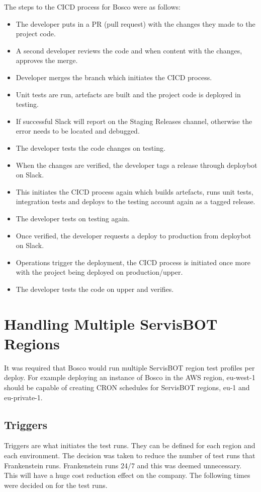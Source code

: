 \documentclass[12pt,a4paper,titlepage]{report}
\begin{document}
The steps to the CICD process for Bosco were as follows:

\begin{itemize}
  \item The developer puts in a PR (pull request) with the changes they made to the project code.
  \item A second developer reviews the code and when content with the changes, approves the merge.
  \item Developer merges the branch which initiates the CICD process. 
  \item Unit tests are run, artefacts are built and the project code is deployed in testing.
  \item If successful Slack will report on the Staging Releases channel, otherwise the error needs to be located and debugged. 
  \item The developer tests the code changes on testing.
  \item When the changes are verified, the developer tags a release through deploybot on Slack.
  \item This initiates the CICD process again which builds artefacts, runs unit tests, integration tests and deploys to the testing account again as a tagged release.
  \item The developer tests on testing again.
  \item Once verified, the developer requests a deploy to production from deploybot on Slack.
  \item Operations trigger the deployment, the CICD process is initiated once more with the project being deployed on production/upper.
  \item The developer tests the code on upper and verifies.
\end{itemize}

\section{Handling Multiple ServisBOT Regions}
It was required that Bosco would run multiple ServisBOT region test profiles per deploy. For example deploying an instance of 
Bosco in the AWS region, eu-west-1 should be capable of creating CRON schedules for ServisBOT regions, eu-1 and eu-private-1. 

\subsection{Triggers}
Triggers are what initiates the test runs. They can be defined for each region and each environment. The decision was taken 
to reduce the number of test runs that Frankenstein runs. Frankenstein runs 24/7 and this was deemed unnecessary. This will have a huge cost reduction 
effect on the company. The following times were decided on for the test runs.
\end{document}
